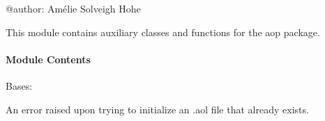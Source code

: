 \documentclass[letterpaper,10pt,english]{sphinxmanual}
\begin{document}
\begin{fulllineitems}
\begin{quote}
\begin{description}
\sphinxAtStartPar
{\hyperref[\detokenize{autoapi/aop/aop/index:aop.aop.Session}]{}}

\end{description}\end{quote}

\end{fulllineitems}


\sphinxstepscope


\subsubsection{}
\label{\detokenize{autoapi/aop/tools/index:module-aop.tools}}\label{\detokenize{autoapi/aop/tools/index:aop-tools}}\label{\detokenize{autoapi/aop/tools/index::doc}}
\sphinxAtStartPar
@author: Amélie Solveigh Hohe

\sphinxAtStartPar
This module contains auxiliary classes and functions for the aop package.


\paragraph{Module Contents}
\label{\detokenize{autoapi/aop/tools/index:module-contents}}

\begin{fulllineitems}
\label{\detokenize{autoapi/aop/tools/index:aop.tools.AolFileAlreadyExistsError}}
\pysigstartsignatures
{}
\pysigstopsignatures
\sphinxAtStartPar
Bases: 

\sphinxAtStartPar
An error raised upon trying to initialize an .aol file that already exists.

\end{fulllineitems}

\end{document}
